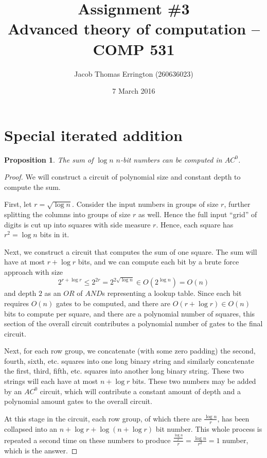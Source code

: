 \documentclass[letterpaper,11pt]{article}
\title{Assignment \#3\\Advanced theory of computation -- COMP 531}
\author{Jacob Thomas Errington (260636023)}
\date{7 March 2016}
\newtheorem{proposition}{Proposition}
\begin{document}
\maketitle

\section*{Special iterated addition}

\begin{proposition}
    The sum of $\log n$ $n$-bit numbers can be computed in $AC^0$.
\end{proposition}

\begin{proof}
    We will construct a circuit of polynomial size and constant depth to
    compute the sum.

    First, let $r = \sqrt {\log n}$. Consider the input numbers in groups of
    size $r$, further splitting the columns into groups of size $r$ as well.
    Hence the full input ``grid'' of digits is cut up into squares with side
    measure $r$. Hence, each square has $r^2 = \log n$ bits in it.

    Next, we construct a circuit that computes the sum of one square. The sum
    will have at most $r + \log r$ bits, and we can compute each bit by a
    brute force approach with size
    $$
    2^{r + \log r} \leq 2^{2r} = 2^{2 \sqrt {\log n}} \in O(2^{\log n}) = O(n)
    $$
    and depth $2$ as an $OR$ of $AND$s representing a lookup table. Since each
    bit requires $O(n)$ gates to be computed, and there are
    $O(r + \log r) \in O(n)$ bits to compute per square, and there are a
    polynomial number of squares, this section of the overall circuit
    contributes a polynomial number of gates to the final circuit.

    Next, for each row group, we concatenate (with some zero padding) the
    second, fourth, sixth, etc. squares into one long binary string and
    similarly concatenate the first, third, fifth, etc. squares into another
    long binary string. These two strings will each have at most $n + \log r$
    bits. These two numbers may be added by an $AC^0$ circuit, which will
    contribute a constant amount of depth and a polynomial amount gates to the
    overall circuit.

    At this stage in the circuit, each row group, of which there are
    $\frac{\log n}{r}$, has been collapsed into an
    $n + \log r + \log{(n + \log r)}$ bit number.
    This whole process is repeated a second time on these numbers to produce
    $\frac{\frac{\log n}{r}}{r} = \frac{\log n}{r^2} = 1$ number, which is the
    answer.
\end{proof}
\end{document}
